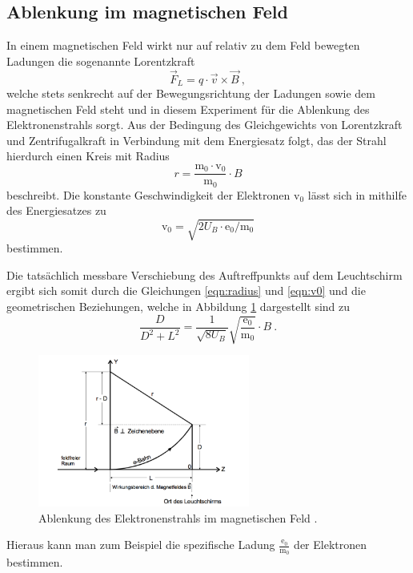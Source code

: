\subsection{Ablenkung im magnetischen Feld}
In einem magnetischen Feld wirkt nur auf relativ zu dem Feld bewegten Ladungen die sogenannte
Lorentzkraft
\begin{equation}
  \vec{F}_L = q \cdot \vec{v} \times \vec{B} \: ,
  \label{eqn:lorentz}
\end{equation}
welche stets senkrecht auf der Bewegungsrichtung der Ladungen sowie dem magnetischen
Feld steht und in diesem Experiment für die Ablenkung des Elektronenstrahls sorgt.
Aus der Bedingung des Gleichgewichts von Lorentzkraft und Zentrifugalkraft in Verbindung
mit dem Energiesatz folgt, das der Strahl hierdurch einen Kreis mit Radius
\begin{equation}
  r = \frac{\text{m}_0 \cdot \text{v}_0}{\text{m}_0} \cdot B
  \label{eqn:radius}
\end{equation}
beschreibt.
Die konstante Geschwindigkeit der Elektronen $\text{v}_0$ lässt sich in mithilfe
des Energiesatzes zu
\begin{equation}
  \text{v}_0 = \sqrt{2 U_B \cdot \text{e}_0 / \text{m}_0}
  \label{eqn:v0}
\end{equation}
bestimmen.

Die tatsächlich messbare Verschiebung des Auftreffpunkts auf dem Leuchtschirm
ergibt sich somit durch die Gleichungen \ref{eqn:radius} und \ref{eqn:v0} und die
geometrischen Beziehungen, welche in Abbildung \ref{fig:magnet} dargestellt sind zu
\begin{equation}
   \frac{D}{D^2 + L^2} = \frac{1}{\sqrt{8 U_B}}\sqrt{\frac{\text{e}_0}{\text{m}_0}}\cdot B \: .
   \label{eqn:magnet}
\end{equation}

\begin{figure}[H]
  \centering
  \includegraphics[height=5cm]{Magnet.png}
  \caption{Ablenkung des Elektronenstrahls im magnetischen Feld \cite{skript2}.}
  \label{fig:magnet}
\end{figure}
Hieraus kann man zum Beispiel die spezifische Ladung $ \frac{{\text{e}_0}}{{\text{m}_0}} $
der Elektronen bestimmen.

